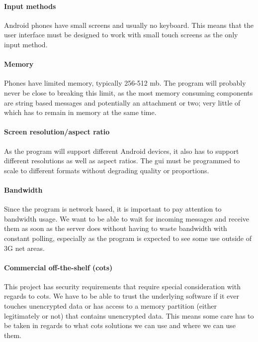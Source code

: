 \paragraph{Input methods} \hfill
\newline
Android phones have small screens and usually no keyboard. This means that the user interface must be designed to work with small touch screens as the only input method.

\paragraph{Memory}\hfill
\newline
Phones have limited memory, typically 256-512 \gls{mb}. The program will probably never be close to breaking this limit, as the most memory consuming components are string based messages and potentially an attachment or two; very little of which has to remain in memory at the same time.

\paragraph{Screen resolution/aspect ratio} \hfill
\newline
As the program will support different Android devices, it also has to support different resolutions as well as aspect ratios. The \gls{gui} must be programmed to scale to different formats without degrading quality or proportions.

\paragraph{Bandwidth} \hfill
\newline
Since the program is network based, it is important to pay attention to bandwidth usage. We want to be able to wait for incoming messages and receive them as soon as the server does without having to waste bandwidth with constant polling, especially as the program is expected to see some use outside of 3G net areas.

\paragraph{Commercial off-the-shelf (\gls{cots})} \hfill
\newline
This project has security requirements that require special consideration with regards to \gls{cots}. We have to be able to trust the underlying software if it ever touches unencrypted data or has access to a memory partition (either legitimately or not) that contains unencrypted data. This means some care has to be taken in regards to what \gls{cots} solutions we can use and where we can use them. 

